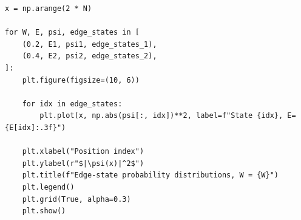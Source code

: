 \documentclass{report}
\begin{document}
\begin{lstlisting}
x = np.arange(2 * N)

for W, E, psi, edge_states in [
    (0.2, E1, psi1, edge_states_1),
    (0.4, E2, psi2, edge_states_2),
]:
    plt.figure(figsize=(10, 6))

    for idx in edge_states:
        plt.plot(x, np.abs(psi[:, idx])**2, label=f"State {idx}, E={E[idx]:.3f}")

    plt.xlabel("Position index")
    plt.ylabel(r"$|\psi(x)|^2$")
    plt.title(f"Edge-state probability distributions, W = {W}")
    plt.legend()
    plt.grid(True, alpha=0.3)
    plt.show()
\end{lstlisting}
\end{document}
